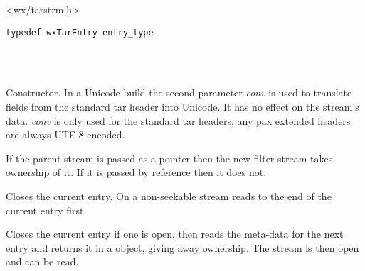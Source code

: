 


<wx/tarstrm.h>

\begin{verbatim}
typedef wxTarEntry entry_type
\end{verbatim}

\\
\\



\label{wxtarinputstreamwxtarinputstream}



Constructor. In a Unicode build the second parameter {\it conv} is
used to translate fields from the standard tar header into Unicode. It has
no effect on the stream's data. {\it conv} is only used for the standard
tar headers, any pax extended headers are always UTF-8 encoded.

If the parent stream is passed as a pointer then the new filter stream
takes ownership of it. If it is passed by reference then it does not.


\label{wxtarinputstreamcloseentry}


Closes the current entry. On a non-seekable stream reads to the end of
the current entry first.


\label{wxtarinputstreamgetnextentry}


Closes the current entry if one is open, then reads the meta-data for
the next entry and returns it in a 
object, giving away ownership. The stream is then open and can be read.


\label{wxtarinputstreamopenentry}

